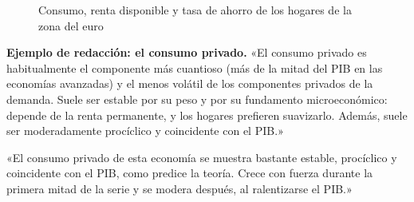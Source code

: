 \documentclass[11pt]{article}
\begin{document}
\begin{figure}[!htb]
\centering
\caption{Consumo, renta disponible y tasa de ahorro de los hogares de la zona del euro}\label{fig:consumo-renta-ahorro}
\end{figure}

\begin{anotaciones}
\textbf{Ejemplo de redacción: el consumo privado.}
«El consumo privado es habitualmente el componente más cuantioso (más de la mitad del PIB en las economías avanzadas) y el menos volátil de los componentes privados de la demanda. Suele ser estable por su peso y por su fundamento microeconómico: depende de la renta permanente, y los hogares prefieren suavizarlo. Además, suele ser moderadamente procíclico y coincidente con el PIB.»

«El consumo privado de esta economía se muestra bastante estable, procíclico y coincidente con el PIB, como predice la teoría. Crece con fuerza durante la primera mitad de la serie y se modera después, al ralentizarse el PIB.»
\end{anotaciones}
\end{document}
